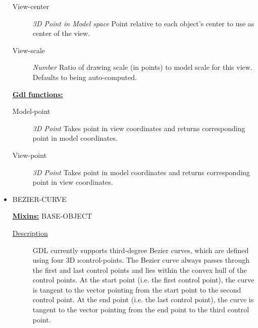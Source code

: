 \documentclass [11pt]{book}
\begin{document}
\begin{itemize}
\begin{description}
\item [View-center]
\emph{3D Point in Model space} Point relative to each object's center to use as center of the view.


\item [View-scale]
\emph{Number} Ratio of drawing scale (in points) to model scale for this view. Defaults to being auto-computed.


\end{description}






\textbf{
\underline{Gdl functions:}}

\begin{description}

\item [Model-point]
\emph{3D Point} Takes point in view coordinates and returns corresponding point in model coordinates.


\item [View-point]
\emph{3D Point} Takes point in model coordinates and returns corresponding point in view coordinates.


\end{description}







\item {}BEZIER-CURVE


\textbf{
\underline{Mixins:}} BASE-OBJECT





\begin{description}

\item [
\underline{Description}]


GDL currently supports third-degree Bezier curves, which are 
defined using four 3D 
\i{control-points}. The Bezier curve always passes 
through the first and last control points and lies within the convex hull of the control 
points. At the start point (i.e. the first control point), the curve is tangent 
to the vector pointing from the start point to the second control point. 
At the end point (i.e. the last control point), the curve is tangent to the 
vector pointing from the end point to the third control point.




\end{description}
\end{itemize}
\end{document}
